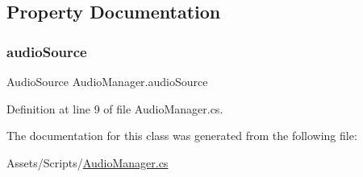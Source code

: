 \subsection{Property Documentation}
\mbox{\label{class_audio_manager_a0c2aea6ea779d69228564aca9476ea80}} 
\subsubsection{\texorpdfstring{audioSource}{audioSource}}
{\footnotesize\ttfamily Audio\+Source Audio\+Manager.\+audio\+Source\hspace{0.3cm}{\ttfamily [get]}}



Definition at line 9 of file Audio\+Manager.\+cs.



The documentation for this class was generated from the following file\+:\begin{DoxyCompactItemize}
\item 
Assets/\+Scripts/\mbox{\hyperlink{_audio_manager_8cs}{Audio\+Manager.\+cs}}\end{DoxyCompactItemize}

